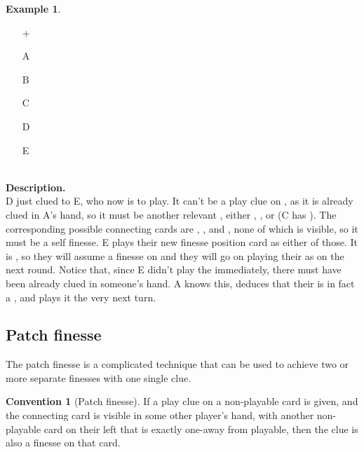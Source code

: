 \documentclass[a4paper]{article}
\theoremstyle{plain}
\theoremstyle{definition}
\newtheorem{example}[theorem]{Example}
\newtheorem{convention}[theorem]{Convention}
\begin{document}
\begin{example}	\hfill \\
	\begin{minipage}{0.45\textwidth}
		\begin{itemize}
			\item[\Large +]      
			\item[\Large A]    
			\item[\Large B]    
			\item[\Large C]    
			\item[\Large D]    
			\item[\Large E]    
		\end{itemize}
	\end{minipage}%
	\begin{minipage}{0.55\textwidth}
		\hfill \\
		
		\textbf{Description.} \\
		
		D just clued  to E, who now is to play. It can't be a play clue on , as it is already clued in A's hand, so it must be another relevant , either , , or  (C has ). The corresponding possible connecting cards are , , and , none of which is visible, so it must be a self finesse. E plays their new finesse position card as either of those. It is , so they will assume a finesse on  and they will go on playing their  as  on the next round. Notice that, since E didn't play the  immediately, there must have been  already clued in someone's hand. A knows this, deduces that their  is in fact a , and plays it the very next turn.
	\end{minipage}
\end{example} \vspace{0.15 cm}

\subsection{Patch finesse}

The patch finesse is a complicated technique that can be used to achieve two or more separate finesses with one single clue.

\begin{convention}[Patch finesse]
	\label{patch-finesse}
	If a play clue on a non-playable card is given, and the connecting card is visible in some other player's hand, with another non-playable card on their left that is exactly one-away from playable, then the clue is also a finesse on that card.
\end{convention}
\end{document}
